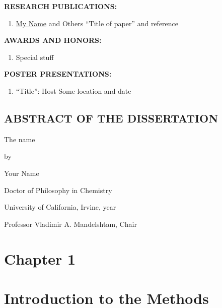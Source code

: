 \documentclass[12pt]{article}
\begin{document}
\uppercase{{\bf Research Publications:}}
\begin{enumerate}
\singlespacing
\item \underline{My Name} and Others
``Title of paper'' and reference
\end{enumerate}

\uppercase{{\bf Awards and Honors:}}
\begin{enumerate}
\singlespacing
\item Special stuff
\end{enumerate}

\uppercase{{\bf Poster Presentations:}}
\begin{enumerate}
\singlespacing
\item ``Title'': Host
	Some location and date
\end{enumerate}

\newpage
\begin{center}
\section*{\uppercase{Abstract of the Dissertation}}
The name

by

Your Name

Doctor of Philosophy in Chemistry

University of California, Irvine, year

Professor Vladimir A. Mandelshtam, Chair
\end{center}
\bigskip
\noindent {}

\cleardoublepage
{}
\section*{Chapter 1}
\bigskip
\section{Introduction to the Methods}
\label{sec:1}

\end{document}
